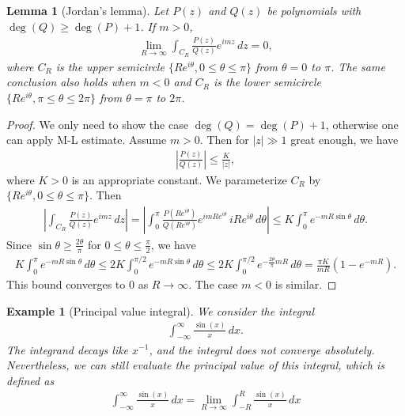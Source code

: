 \documentclass{article}
\numberwithin{equation}{section}
\theoremstyle{plain}
\newtheorem{lemma}[theorem]{Lemma}
\newtheorem{example}[theorem]{Example}
\theoremstyle{definition}
\begin{document}
\begin{lemma}[Jordan's lemma]\label{jordanlemma}
Let $P(z)$ and $Q(z)$ be polynomials with $\deg(Q)\geq\deg(P)+1$. If $m>0$,
\begin{align*}
	\lim_{R\to\infty}\int_{C_R}\frac{P(z)}{Q(z)}e^{i mz}\,dz=0,
\end{align*}
where $C_R$ is the upper semicircle $\{Re^{i\theta},0\leq\theta\leq\pi\}$ from $\theta=0$ to $\pi$. The same conclusion also holds when $m<0$ and $C_R$ is the lower semicircle $\{Re^{i\theta},\pi\leq\theta\leq2\pi\}$ from $\theta=\pi$ to $2\pi$.
\end{lemma}
\begin{proof}
We only need to show the case $\deg(Q)=\deg(P)+1$, otherwise one can apply M-L estimate. Assume $m>0$. Then for $\vert z\vert\gg 1$ great enough, we have
\begin{align*}
\left\vert\frac{P(z)}{Q(z)}\right\vert\leq\frac{K}{\vert z\vert},
\end{align*}
where $K>0$ is an appropriate constant. We parameterize $C_R$ by $\{Re^{i\theta},0\leq\theta\leq\pi\}$. Then
\begin{align*}
	\left\vert\int_{C_R}\frac{P(z)}{Q(z)}e^{i mz}\,dz\right\vert=\left\vert\int_0^\pi\frac{P(Re^{i\theta})}{Q(Re^{i\theta})}e^{i mRe^{i\theta}}\,i Re^{i\theta}\,d\theta\right\vert\leq K\int_0^\pi e^{-mR\sin\theta}\,d\theta.
\end{align*}
Since $\sin\theta\geq\frac{2\theta}{\pi}$ for $0\leq\theta\leq\frac{\pi}{2}$, we have
\begin{align*}
	K\int_0^\pi e^{-mR\sin\theta}\,d\theta\leq 2K\int_0^{\pi/2}e^{-mR\sin\theta}\,d\theta\leq 2K\int_0^{\pi/2}e^{-\frac{2\theta}{\pi}mR}\,d\theta=\frac{\pi K}{mR}\left(1-e^{-mR}\right).
\end{align*}
This bound converges to $0$ as $R\to\infty$. The case $m<0$ is similar.
\end{proof}
\begin{example}[Principal value integral]
We consider the integral
\begin{align*}
	\int_{-\infty}^\infty\frac{\sin(x)}{x}\,dx.
\end{align*}
The integrand decays like $x^{-1}$, and the integral does not converge absolutely. Nevertheless, we can still evaluate the principal value of this integral, which is defined as
\begin{align*}
	\int_{-\infty}^{\infty}\frac{\sin(x)}{x}\,dx=\lim_{R\to\infty}\int_{-R}^R\frac{\sin(x)}{x}\,dx
\end{align*}
\end{example}
\end{document}
